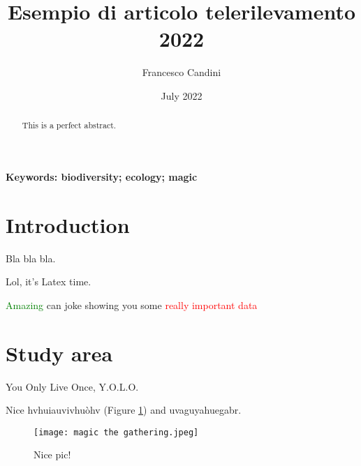 \documentclass[a4paper, 12pt]{article} %
\title{Esempio di articolo telerilevamento 2022} %
\author{Francesco Candini} %
\date{July 2022} %
\newcommand{\tr}{\textcolor{red}} %
\begin{document}

\maketitle

\begin{abstract}
   \centering This is a perfect abstract. 
\end{abstract}

\noindent \textbf{Keywords:  biodiversity; ecology; magic} %

\tableofcontents %



\section{Introduction} \label{Sec.: Intro} %


Bla bla bla. %

Lol, it's Latex time. %

\bigskip{}

\textcolor{green}{Amazing}
 can joke showing you some \Large{\tr{really important data}}


\section{Study area}


\normalsize You Only Live Once, Y.O.L.O. 

Nice hvhuiauvivhuòhv (Figure \ref{Fig.: Magic}) and uvaguyahuegabr. %
\begin{figure}
 \texttt{[image: magic the gathering.jpeg]} 
 \centering %
 \caption{Nice pic!} %
 \label{Fig.: Magic} %
\end{figure}
\end{document}
